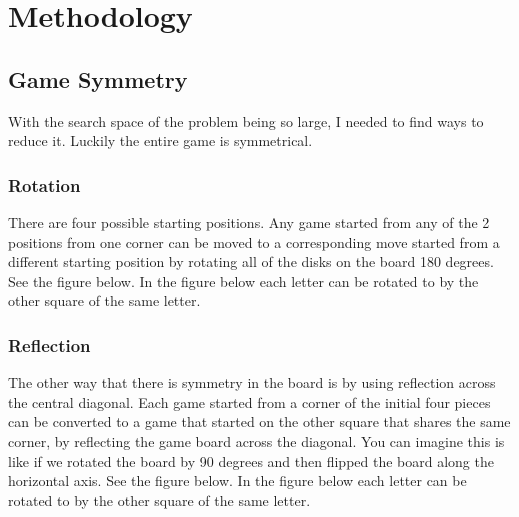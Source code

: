 \documentclass{article}
\begin{document}
\newpage

\section{Methodology}

\subsection{Game Symmetry}

With the search space of the problem being so large, I needed to find ways to reduce it. Luckily the entire game is symmetrical.

\subsubsection{Rotation}

There are four possible starting positions. Any game started from any of the 2 positions from one corner can be moved to a corresponding move started from a different starting position by rotating all of the disks on the board 180 degrees. See the figure below. In the figure below each letter can be rotated to by the other square of the same letter.

\begin{othelloboard}{0.5}
\dotmarkings
{}
\end{othelloboard}

\subsubsection{Reflection}

The other way that there is symmetry in the board is by using reflection across the central diagonal. Each game started from a corner of the initial four pieces can be converted to a game that started on the other square that shares the same corner, by reflecting the game board across the diagonal. You can imagine this is like if we rotated the board by 90 degrees and then flipped the board along the horizontal axis. See the figure below. In the figure below each letter can be rotated to by the other square of the same letter.

\begin{othelloboard}{0.5}
\dotmarkings
{}
\end{othelloboard}
\end{document}

